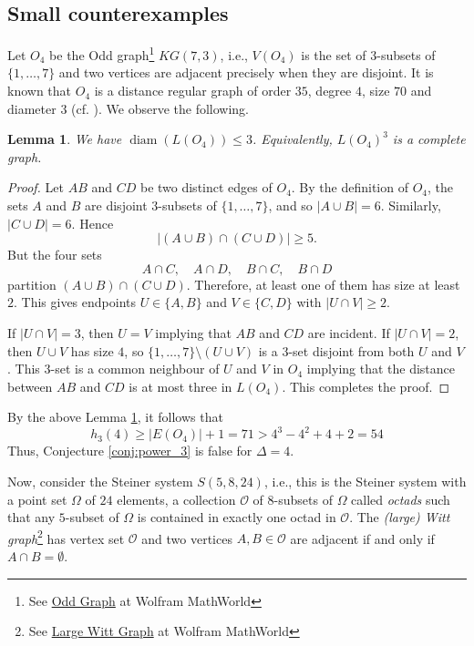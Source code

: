 \documentclass[11pt]{article}
\theoremstyle{plain}
\newtheorem{lemma}[theorem]{Lemma}
\numberwithin{equation}{section}
\DeclareMathOperator{\diam}{diam}
\begin{document}
\subsection{Small counterexamples}

Let $O_4$ be the Odd graph\footnote{See \href{https://mathworld.wolfram.com/OddGraph.html}{Odd Graph} at Wolfram MathWorld} $KG(7,3)$, i.e., $V(O_4)$ is the set of $3$-subsets of $\{1, \ldots, 7\}$ and two vertices are adjacent precisely when they are disjoint. It is known that $O_4$ is a distance regular graph of order $35$, degree $4$, size $70$ and diameter $3$ (cf. \cite{Brouwer_Cohen_Neumaier_1989}). We observe the following.

\begin{lemma}\label{lemma:diam_3_O_4} We have $\diam(L(O_4))\le 3$. Equivalently, $L(O_4)^3$ is a complete graph.
\end{lemma}

\begin{proof}
Let $AB$ and $CD$ be two distinct edges of $O_4$. By the definition of $O_4$, the sets $A$ and $B$ are disjoint $3$-subsets of $\{1, \ldots, 7\}$, and so $|A\cup B|=6$. Similarly, $|C\cup D|=6$. Hence
\[
    |(A\cup B)\cap (C\cup D)|\ge 5.
\]
But the four sets
\[
    A\cap C,
    \quad A\cap D ,
    \quad B\cap C,
    \quad B\cap D
\]
partition $(A\cup B)\cap (C\cup D)$. Therefore, at least one of them has size at
least $2$. This gives endpoints $U\in\{A,B\}$ and $V\in\{C,D\}$ with
$|U\cap V|\ge 2$.

If $|U\cap V|=3$, then $U=V$ implying that $AB$ and $CD$ are incident. If $|U\cap V|=2$, then $U\cup V$ has size $4$,
so $\{1,\ldots, 7\}\setminus (U\cup V)$ is a $3$-set disjoint from both $U$ and $V$. This
$3$-set is a common neighbour of $U$ and $V$ in $O_4$ implying that the distance between $AB$ and $CD$ is at most three in $L(O_4)$. This completes the proof. 
\end{proof}

By the above Lemma \ref{lemma:diam_3_O_4}, it follows that 
\[ h_3(4)\ge |E(O_4)|+1 = 71 >  4^3-4^2+4+2=54 \]
Thus, Conjecture \ref{conj:power_3} is false for $\Delta = 4$.

Now, consider the Steiner system $S(5,8,24)$, i.e., this is the Steiner system with a point set $\Omega$ of $24$ elements, a collection $\mathcal{O}$ of $8$-subsets of $\Omega$ called \emph{octads} such that any $5$-subset of $\Omega$ is contained in exactly one octad in $\mathcal{O}$. The \emph{(large) Witt graph}\footnote{See \href{https://mathworld.wolfram.com/LargeWittGraph.html}{Large Witt Graph} at Wolfram MathWorld} has vertex set $\mathcal{O}$ and two vertices $A, B\in \mathcal{O}$ are adjacent if and only if $A\cap B = \emptyset$. 
\end{document}
